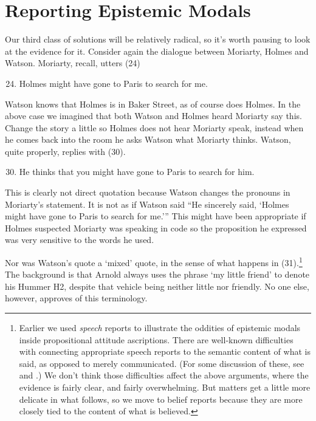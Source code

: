 \section{Reporting Epistemic Modals} 
 
Our third class of solutions will be relatively radical, so it's worth pausing to look at the evidence for it. Consider again the dialogue between Moriarty, Holmes and Watson. Moriarty, recall, utters (24)
 
\begin{enumerate}
\setcounter{enumi}{23} 
\item Holmes might have gone to Paris to search for me.
\end{enumerate}

\noindent Watson knows that Holmes is in Baker Street, as of course does Holmes. In the above case we imagined that both Watson and Holmes heard Moriarty say this. Change the story a little so Holmes does not hear Moriarty speak, instead when he comes back into the room he asks Watson what Moriarty thinks. Watson, quite properly, replies with (30).
 
\begin{enumerate}
\setcounter{enumi}{29} 
\item He thinks that you might have gone to Paris to search for him.
\end{enumerate}

\noindent This is clearly not direct quotation because Watson changes the pronouns in Moriarty's statement. It is not as if Watson said ``He sincerely said, `Holmes might have gone to Paris to search for me.''' This might have been appropriate if Holmes suspected Moriarty was speaking in code so the proposition he expressed was very sensitive to the words he used.
 
Nor was Watson's quote a `mixed' quote, in the sense of what happens in (31).\footnote{Earlier we used \textit{speech} reports to illustrate the oddities of epistemic modals inside propositional attitude ascriptions. There are well-known difficulties with connecting appropriate speech reports to the semantic content of what is said, as opposed to merely communicated. (For some discussion of these, see \citet{Soames2002} and \citet{Cappelen1997}.) We don't think those difficulties affect the above arguments, where the evidence is fairly clear, and fairly overwhelming. But matters get a little more delicate in what follows, so we move to belief reports because they are more closely tied to the content of what is believed.} The background is that Arnold always uses the phrase `my little friend' to denote his Hummer H2, despite that vehicle being neither little nor friendly. No one else, however, approves of this terminology.
 
